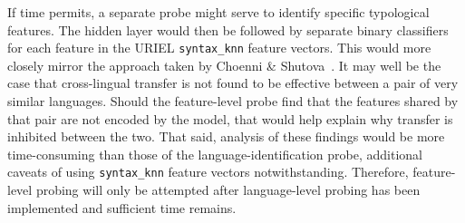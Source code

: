 			If time permits, a separate probe might serve to identify specific typological features. The hidden layer would then be followed by separate binary classifiers for each feature in the URIEL \texttt{syntax\_knn} feature vectors. This would more closely mirror the approach taken by Choenni \& Shutova~\cite{choenni-shutova-2022-investigating}. It may well be the case that cross-lingual transfer is not found to be effective between a pair of very similar languages. Should the feature-level probe find that the features shared by that pair are not encoded by the model, that would help explain why transfer is inhibited between the two. That said, analysis of these findings would be more time-consuming than those of the language-identification probe, additional caveats of using \texttt{syntax\_knn} feature vectors notwithstanding. Therefore, feature-level probing will only be attempted after language-level probing has been implemented and sufficient time remains.

	\hfill



